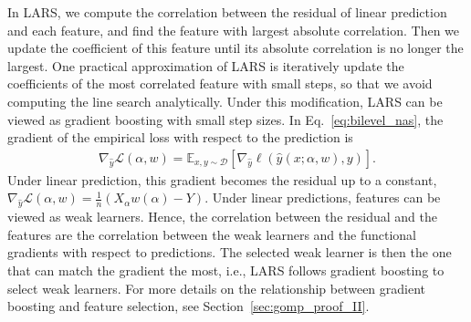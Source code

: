 In LARS, we compute the correlation between the residual of linear prediction and
each feature, and find the feature with largest absolute correlation. Then we update the 
coefficient of this feature until its absolute correlation is no longer the largest.
One practical approximation of LARS is iteratively update the coefficients of the most 
correlated feature with small steps, so that we avoid computing the line search analytically. 
Under this modification, LARS can be viewed as gradient boosting with small step sizes.
In Eq.~\ref{eq:bilevel_nas}, the gradient of the empirical loss with respect to the prediction is 
\begin{align}
\nabla _{\hat{y}} \mathcal{L} (\alpha, w) = \mathbb{E} _{x, y \sim \mathcal{D}} [ \nabla _{\hat{y}} \ell(\hat{y}(x ; \alpha, w), y) ].
\label{eq:nas_func_g_y}
\end{align}
Under linear prediction, this gradient becomes the residual up to a constant, 
$
\nabla _{\hat{y}} \mathcal{L} (\alpha, w) = \frac{1}{n}(X_{\alpha}w(\alpha) - Y).
$
Under linear predictions, features can be viewed as weak learners. 
Hence, the correlation between the residual and the features are
the correlation between the weak learners and the functional gradients with respect to predictions.
The selected weak learner is then the one that can match the gradient the most, i.e., 
LARS follows gradient boosting to select weak learners.
For more details on the relationship between gradient boosting
and feature selection, see Section~\ref{sec:gomp_proof_II}.







